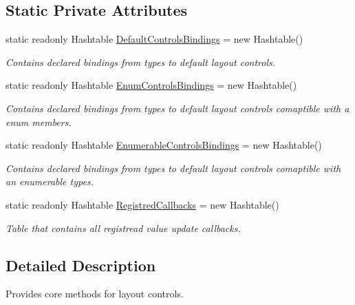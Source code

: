 \subsection*{Static Private Attributes}
\begin{DoxyCompactItemize}
\item 
static readonly Hashtable \mbox{\hyperlink{class_wpf_handler_1_1_u_i_1_1_auto_layout_1_1_layout_handler_a15ec26f7b47df47d599c8e649b766463}{Default\+Controls\+Bindings}} = new Hashtable()
\begin{DoxyCompactList}\small\item\em Contains declared bindings from types to default layout controls. \end{DoxyCompactList}\item 
static readonly Hashtable \mbox{\hyperlink{class_wpf_handler_1_1_u_i_1_1_auto_layout_1_1_layout_handler_ae61aae6b0256f71e33dc8c8ed1403ff0}{Enum\+Controls\+Bindings}} = new Hashtable()
\begin{DoxyCompactList}\small\item\em Contains declared bindings from types to default layout controls comaptible with a enum members. \end{DoxyCompactList}\item 
static readonly Hashtable \mbox{\hyperlink{class_wpf_handler_1_1_u_i_1_1_auto_layout_1_1_layout_handler_a9838c1e408adbcb072a03521be50e6fe}{Enumerable\+Controls\+Bindings}} = new Hashtable()
\begin{DoxyCompactList}\small\item\em Contains declared bindings from types to default layout controls comaptible with an enumerable types. \end{DoxyCompactList}\item 
static readonly Hashtable \mbox{\hyperlink{class_wpf_handler_1_1_u_i_1_1_auto_layout_1_1_layout_handler_afda300c91d5d5e45c7fb51d1154fcf4b}{Registred\+Callbacks}} = new Hashtable()
\begin{DoxyCompactList}\small\item\em Table that contains all registread value update callbacks. \end{DoxyCompactList}\end{DoxyCompactItemize}


\subsection{Detailed Description}
Provides core methods for layout controls. 



